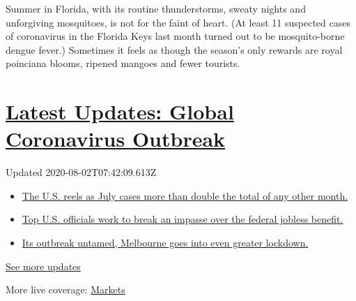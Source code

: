 Summer in Florida, with its routine thunderstorms, sweaty nights and
unforgiving mosquitoes, is not for the faint of heart. (At least 11
suspected cases of coronavirus in the Florida Keys last month turned out
to be mosquito-borne dengue fever.) Sometimes it feels as though the
season's only rewards are royal poinciana blooms, ripened mangoes and
fewer tourists.

\hypertarget{latest-updates-global-coronavirus-outbreak}{%
\section{\texorpdfstring{\href{https://www.nytimes.com/2020/08/01/world/coronavirus-covid-19.html?action=click\&pgtype=Article\&state=default\&region=MAIN_CONTENT_1\&context=storylines_live_updates}{Latest
Updates: Global Coronavirus
Outbreak}}{Latest Updates: Global Coronavirus Outbreak}}\label{latest-updates-global-coronavirus-outbreak}}

Updated 2020-08-02T07:42:09.613Z

\begin{itemize}
\tightlist
\item
  \href{https://www.nytimes.com/2020/08/01/world/coronavirus-covid-19.html?action=click\&pgtype=Article\&state=default\&region=MAIN_CONTENT_1\&context=storylines_live_updates\#link-34047410}{The
  U.S. reels as July cases more than double the total of any other
  month.}
\item
  \href{https://www.nytimes.com/2020/08/01/world/coronavirus-covid-19.html?action=click\&pgtype=Article\&state=default\&region=MAIN_CONTENT_1\&context=storylines_live_updates\#link-780ec966}{Top
  U.S. officials work to break an impasse over the federal jobless
  benefit.}
\item
  \href{https://www.nytimes.com/2020/08/01/world/coronavirus-covid-19.html?action=click\&pgtype=Article\&state=default\&region=MAIN_CONTENT_1\&context=storylines_live_updates\#link-2bc8948}{Its
  outbreak untamed, Melbourne goes into even greater lockdown.}
\end{itemize}

\href{https://www.nytimes.com/2020/08/01/world/coronavirus-covid-19.html?action=click\&pgtype=Article\&state=default\&region=MAIN_CONTENT_1\&context=storylines_live_updates}{See
more updates}

More live coverage:
\href{https://www.nytimes.com/live/2020/07/31/business/stock-market-today-coronavirus?action=click\&pgtype=Article\&state=default\&region=MAIN_CONTENT_1\&context=storylines_live_updates}{Markets}

